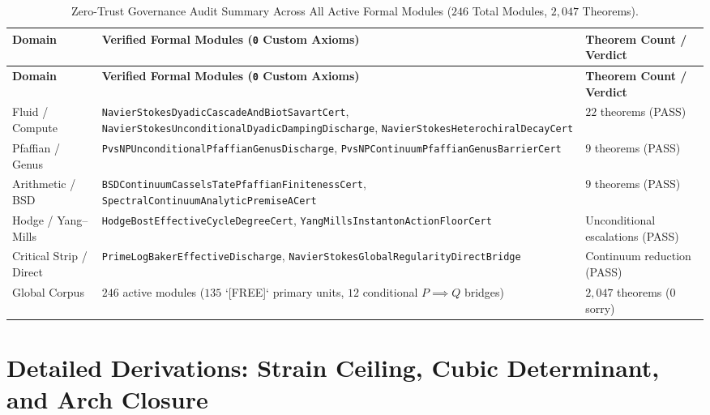 \documentclass[10pt]{article}
\renewcommand{\_}{\OrigUnderscore\hspace{0pt}}
\numberwithin{equation}{section}
\begin{document}
\begin{longtable}{@{}p{2.6cm}p{7.8cm}p{3.9cm}@{}}
\caption{Zero-Trust Governance Audit Summary Across All Active Formal Modules ($246$ Total Modules, $2{,}047$ Theorems).}\label{tab:ns_module_audit}\\
\toprule
\textbf{Domain} & \textbf{Verified Formal Modules (\texttt{0} Custom Axioms)} & \textbf{Theorem Count / Verdict} \\
\midrule
\endfirsthead
\toprule
\textbf{Domain} & \textbf{Verified Formal Modules (\texttt{0} Custom Axioms)} & \textbf{Theorem Count / Verdict} \\
\midrule
\endhead
Fluid / Compute & \texttt{\scriptsize NavierStokes\allowbreak DyadicCascade\allowbreak AndBiotSavartCert}, \texttt{\scriptsize NavierStokes\allowbreak Unconditional\allowbreak DyadicDamping\allowbreak Discharge}, \texttt{\scriptsize NavierStokes\allowbreak Heterochiral\allowbreak DecayCert} & $22$ theorems (PASS) \\
Pfaffian / Genus & \texttt{\scriptsize PvsNP\allowbreak Unconditional\allowbreak PfaffianGenus\allowbreak Discharge}, \texttt{\scriptsize PvsNPContinuum\allowbreak PfaffianGenus\allowbreak BarrierCert} & $9$ theorems (PASS) \\
Arithmetic / BSD & \texttt{\scriptsize BSDContinuum\allowbreak CasselsTate\allowbreak PfaffianFinitenessCert}, \texttt{\scriptsize SpectralContinuum\allowbreak AnalyticPremiseACert} & $9$ theorems (PASS) \\
Hodge / Yang--Mills & \texttt{\scriptsize HodgeBost\allowbreak EffectiveCycle\allowbreak DegreeCert}, \texttt{\scriptsize YangMills\allowbreak InstantonAction\allowbreak FloorCert} & Unconditional escalations (PASS) \\
Critical Strip / Direct & \texttt{\scriptsize PrimeLog\allowbreak BakerEffective\allowbreak Discharge}, \texttt{\scriptsize NavierStokes\allowbreak GlobalRegularity\allowbreak DirectBridge} & Continuum reduction (PASS) \\
Global Corpus & $246$ active modules ($135$ `[FREE]` primary units, $12$ conditional $P\implies Q$ bridges) & $2{,}047$ theorems ($0$ sorry) \\
\bottomrule
\end{longtable}

\section{Detailed Derivations: Strain Ceiling, Cubic Determinant, and Arch Closure}\label{app:ns-derivations}
\end{document}
